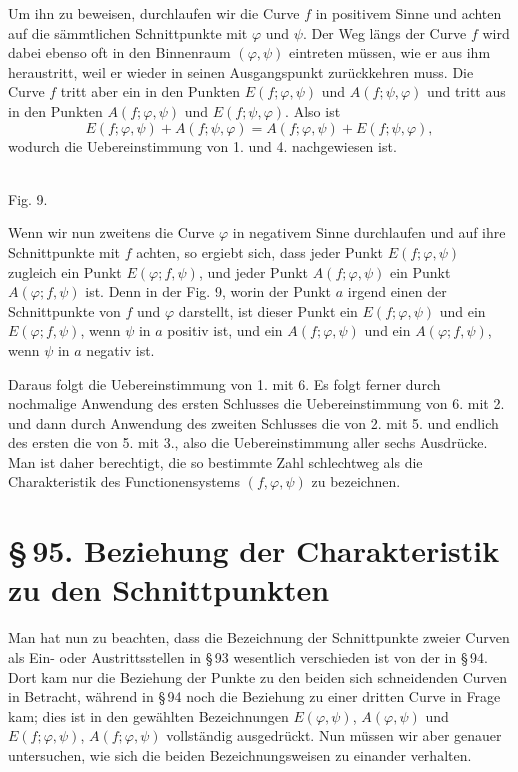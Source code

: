 \documentclass[11pt]{article}
\providecommand{\sect}[2]{\section*{\S\,#1. #2}}
\begin{document}
Um ihn zu beweisen, durchlaufen wir die Curve $f$ in positivem Sinne und achten auf die sämmtlichen Schnittpunkte mit $\varphi$ und $\psi$. Der Weg längs der Curve $f$ wird dabei ebenso oft in den Binnenraum $(\varphi,\psi)$ eintreten müssen, wie er aus ihm heraustritt, weil er wieder in seinen Ausgangspunkt zurückkehren muss. Die Curve $f$ tritt aber ein in den Punkten $E(f;\varphi,\psi)$ und $A(f;\psi,\varphi)$ und tritt aus in den Punkten $A(f;\varphi,\psi)$ und $E(f;\psi,\varphi)$. Also ist
\[
E(f;\varphi,\psi)+A(f;\psi,\varphi)=A(f;\varphi,\psi)+E(f;\psi,\varphi),
\]
wodurch die Uebereinstimmung von 1. und 4. nachgewiesen ist.


\begin{center}
\\[-0.2em]
{\small Fig. 9.}
\end{center}


Wenn wir nun zweitens die Curve $\varphi$ in negativem Sinne durchlaufen und auf ihre Schnittpunkte mit $f$ achten, so ergiebt sich, dass jeder Punkt $E(f;\varphi,\psi)$ zugleich ein Punkt $E(\varphi;f,\psi)$, und jeder Punkt $A(f;\varphi,\psi)$ ein Punkt $A(\varphi;f,\psi)$ ist. Denn in der Fig. 9, worin der Punkt $a$ irgend einen der Schnittpunkte von $f$ und $\varphi$ darstellt, ist dieser Punkt ein $E(f;\varphi,\psi)$ und ein $E(\varphi;f,\psi)$, wenn $\psi$ in $a$ positiv ist, und ein $A(f;\varphi,\psi)$ und ein $A(\varphi;f,\psi)$, wenn $\psi$ in $a$ negativ ist.

Daraus folgt die Uebereinstimmung von 1. mit 6. Es folgt ferner durch nochmalige Anwendung des ersten Schlusses die Uebereinstimmung von 6. mit 2. und dann durch Anwendung des zweiten Schlusses die von 2. mit 5. und endlich des ersten die von 5. mit 3., also die Uebereinstimmung aller sechs Ausdrücke. Man ist daher berechtigt, die so bestimmte Zahl schlechtweg als die Charakteristik des Functionensystems $(f,\varphi,\psi)$ zu bezeichnen.

\sect{95}{Beziehung der Charakteristik zu den Schnittpunkten}

Man hat nun zu beachten, dass die Bezeichnung der Schnittpunkte zweier Curven als Ein- oder Austrittsstellen in \S\,93 wesentlich verschieden ist von der in \S\,94. Dort kam nur die Beziehung der Punkte zu den beiden sich schneidenden Curven in Betracht, während in \S\,94 noch die Beziehung zu einer dritten Curve in Frage kam; dies ist in den gewählten Bezeichnungen $E(\varphi,\psi)$, $A(\varphi,\psi)$ und $E(f;\varphi,\psi)$, $A(f;\varphi,\psi)$ vollständig ausgedrückt. Nun müssen wir aber genauer untersuchen, wie sich die beiden Bezeichnungsweisen zu einander verhalten.
\end{document}

